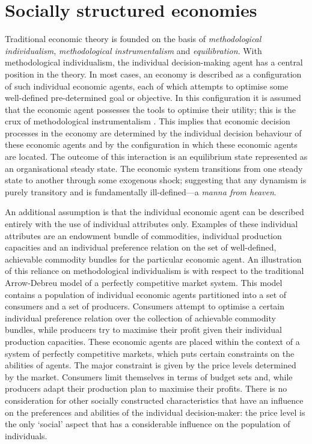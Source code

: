 \section{Socially structured economies}
\label{sec:SociallyStructuredEconomies}

Traditional economic theory is founded on the basis of \emph{methodological individualism}, \emph{methodological instrumentalism} and \emph{equilibration}. With methodological individualism, the individual decision-making agent has a central position in the theory. In most cases, an economy is described as a configuration of such individual economic agents, each of which attempts to optimise some well-defined pre-determined goal or objective. In this configuration it is assumed that the economic agent possesses the tools to optimise their utility; this is the crux of methodological instrumentalism \citep{Arnsperger2006}. This implies that economic decision processes in the economy are determined by the individual decision behaviour of these economic agents and by the configuration in which these economic agents are located. The outcome of this interaction is an equilibrium state represented as an organisational steady state. The economic system transitions from one steady state to another through some exogenous shock; suggesting that any dynamism is purely transitory and is fundamentally ill-defined---a \emph{manna from heaven}.

An additional assumption is that the individual economic agent can be described entirely with the use of individual attributes only. Examples of these individual attributes are an endowment bundle of commodities, individual production capacities and an individual preference relation on the set of well-defined, achievable commodity bundles for the particular economic agent. An illustration of this reliance on methodological individualism is with respect to the traditional Arrow-Debreu model of a perfectly competitive market system. This model contains a population of individual economic agents partitioned into a set of consumers and a set of producers. Consumers attempt to optimise a certain individual preference relation over the collection of achievable commodity bundles, while producers try to maximise their profit given their individual production capacities. These economic agents are placed within the context of a system of perfectly competitive markets, which puts certain constraints on the abilities of agents. The major constraint is given by the price levels determined by the market. Consumers limit themselves in terms of budget sets and, while producers adapt their production plan to maximise their profits. There is no consideration for other socially constructed characteristics that have an influence on the preferences and abilities of the individual decision-maker: the price level is the only `social' aspect that has a considerable influence on the population of individuals.

